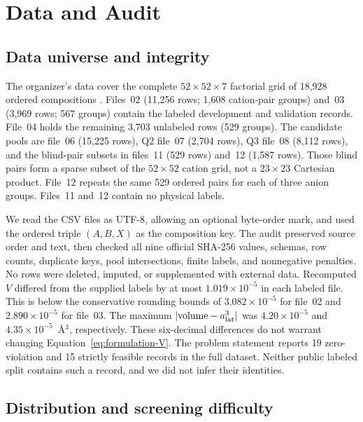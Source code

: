 \section{Data and Audit}
\label{sec:data-audit}

\subsection{Data universe and integrity}

The organizer's data cover the complete $52\times52\times7$ factorial
grid of 18,928 ordered compositions \cite{apmcm2026problemD}.  Files~02
(11,256 rows; 1,608 cation-pair groups) and~03 (3,969 rows; 567 groups)
contain the labeled development and validation records.  File~04 holds
the remaining 3,703 unlabeled rows (529 groups).  The candidate pools are
file~06 (15,225 rows), Q2 file~07 (2,704 rows), Q3 file~08 (8,112 rows),
and the blind-pair subsets in files~11 (529 rows) and~12 (1,587 rows).
Those blind pairs form a sparse subset of the $52\times52$ cation grid,
not a $23\times23$ Cartesian product.  File~12 repeats the same 529
ordered pairs for each of three anion groups.  Files~11 and~12 contain no
physical labels.

We read the CSV files as UTF-8, allowing an optional byte-order mark,
and used the ordered triple $(A,B,X)$ as the composition key.  The audit
preserved source order and text, then checked all nine official SHA-256
values, schemas, row counts, duplicate keys, pool intersections, finite
labels, and nonnegative penalties.  No rows were deleted, imputed, or
supplemented with external data.  Recomputed $V$ differed from the supplied
labels by at most $1.019\times10^{-5}$ in each labeled file.  This is below
the conservative rounding bounds of $3.082\times10^{-5}$ for file~02 and
$2.890\times10^{-5}$ for file~03.  The maximum
$|\mathrm{volume}-a_{\rm lat}^3|$ was $4.20\times10^{-5}$ and
$4.35\times10^{-5}$~\AA$^3$, respectively.  These six-decimal differences
do not warrant changing Equation~\eqref{eq:formulation-V}.  The problem
statement reports 19 zero-violation and 15 strictly feasible records in
the full dataset.  Neither public labeled split contains such a record,
and we did not infer their identities.

\subsection{Distribution and screening difficulty}

